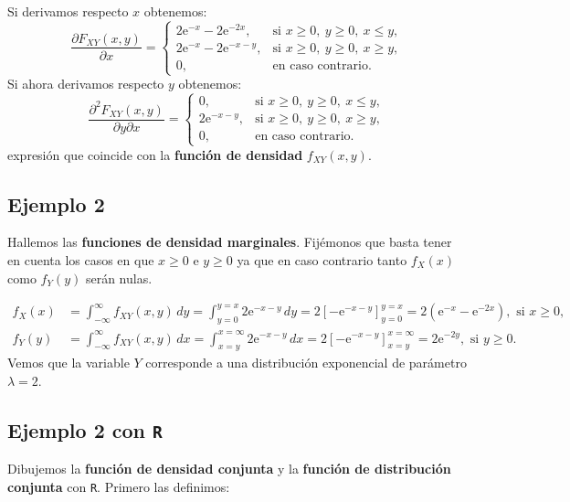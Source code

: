 \documentclass[]{book}
\begin{document}
Si derivamos respecto \(x\) obtenemos:
\[
\frac{\partial F_{XY}(x,y)}{\partial x}=\begin{cases}
2\mathrm{e}^{-x}-2\mathrm{e}^{-2x}, & \mbox{si }x\geq 0,\ y\geq 0,\ x\leq y,\\
2\mathrm{e}^{-x}-2\mathrm{e}^{-x-y}, & \mbox{si }x\geq 0,\ y\geq 0,\ x\geq y,\\
0, & \mbox{en caso contrario.}
\end{cases}
\]
Si ahora derivamos respecto \(y\) obtenemos:
\[
\frac{\partial^2 F_{XY}(x,y)}{\partial y\partial x}=\begin{cases}
0, & \mbox{si }x\geq 0,\ y\geq 0,\ x\leq y,\\
2\mathrm{e}^{-x-y}, & \mbox{si }x\geq 0,\ y\geq 0,\ x\geq y,\\
0, & \mbox{en caso contrario.}
\end{cases}
\]
expresión que coincide con la \textbf{función de densidad} \(f_{XY}(x,y)\).

\hypertarget{ejemplo-2-7}{%
\subsection{Ejemplo 2}\label{ejemplo-2-7}}

Hallemos las \textbf{funciones de densidad marginales}. Fijémonos que basta tener en cuenta los casos en que \(x\geq 0\) e \(y\geq 0\) ya que en caso contrario tanto \(f_X(x)\) como \(f_Y(y)\) serán nulas.

\[
\begin{array}{rl}
f_X(x) & = \int_{-\infty}^{\infty} f_{XY}(x,y)\, dy =\int_{y=0}^{y=x}2\mathrm{e}^{-x-y}\, dy = 2\left[-\mathrm{e}^{-x-y}\right]_{y=0}^{y=x} = 2\left(\mathrm{e}^{-x}-\mathrm{e}^{-2x}\right),\mbox{ si }x\geq 0, \\
f_Y(y) & = \int_{-\infty}^{\infty} f_{XY}(x,y)\, dx =\int_{x=y}^{x=\infty}2\mathrm{e}^{-x-y}\, dx = 2\left[-\mathrm{e}^{-x-y}\right]_{x=y}^{x=\infty} = 2\mathrm{e}^{-2y}, \mbox{ si }y\geq 0.
\end{array}
\]
Vemos que la variable \(Y\) corresponde a una distribución exponencial de parámetro \(\lambda =2\).

\hypertarget{ejemplo-2-con-r}{%
\subsection{\texorpdfstring{Ejemplo 2 con \texttt{R}}{Ejemplo 2 con R}}\label{ejemplo-2-con-r}}

Dibujemos la \textbf{función de densidad conjunta} y la \textbf{función de distribución conjunta} con \texttt{R}. Primero las definimos:
\end{document}
